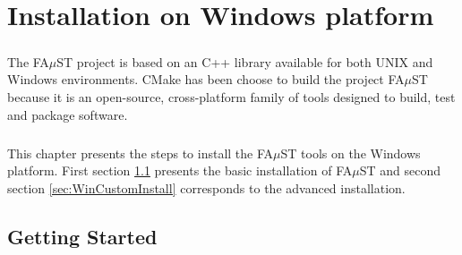 \chapter{Installation on Windows platform}\label{sec:WinInstall}

\paragraph{}The FA$\mu$ST project is based on an C++ library available for both UNIX and Windows environments. CMake has been choose to build the project FA$\mu$ST because it is an open-source, cross-platform family of tools designed to build, test and package software.

\paragraph{}This chapter presents the steps to install the FA$\mu$ST tools on the Windows platform. First section \ref{sec:WinGettingStarted} presents the basic installation of FA$\mu$ST and second section \ref{sec:WinCustomInstall} corresponds to the advanced  installation.


\section{Getting Started} \label{sec:WinGettingStarted}

